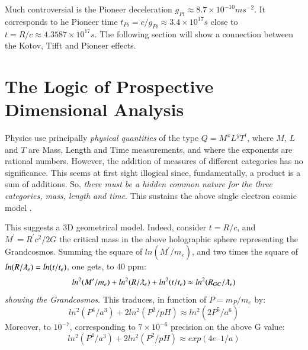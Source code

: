 \documentclass[twoside,draft]{article}
\begin{document}
\begin{sloppypar}
Much controversial is the Pioneer deceleration \cite{Nieto} $g_{Pi} \approx 8.7 \times 10^{-10} ms^{-2}$. It corresponds to he Pioneer time $t_{Pi} = c/g_{Pi} \approx 3.4 \times 10^{17} s $ close to $t = R/c \approx 4.3587 \times 10^{17} s $. The following section will show a connection between the Kotov, Tifft and Pioneer effects.

\section{The Logic of Prospective Dimensional Analysis}

Physics use principally \textit{physical quantities} of the type $Q = M^{x} L^{y} T^{t}$, where $M$, $L$ and $T$ are Mass, Length and Time measurements, and where the exponents are rational numbers. However, the addition of measures of different categories has no significance. This seems at first sight illogical since, fundamentally, a product is a sum of additions. So, \textit{there must be a hidden common nature for the three categories, mass, length and time}. This sustains the above single electron cosmic model \cite{Sanchez1}. 

This suggests a 3D geometrical model. Indeed, consider $t =R/c$, and $M^{\prime} = R^{\prime} c^{2} /2G$ the critical mass in the above holographic sphere representing the Grandcosmos. Summing the square of $ln(M^{\prime}/m_{e} )$, and two times the square of $ln(R/\lambdabar_{e} ) = ln(t/t_{e} )$, one gets, to 40 ppm:
\begin{equation}
ln^{2} (M^{\prime}/m_{e} ) + ln^{2} (R/\lambdabar_{e}) + ln^2 (t/t_{e} ) \approx ln^2 (R_{GC} /\lambdabar_{e} )
\end{equation} 
\textit{showing the Grandcosmos}. This traduces, in function of $P = m_P/m_e$ by:
\begin{equation}
ln^2(P^4/a^3) + 2 ln^2(P^2/pH) \approx ln^2(2P^5/a^6)
\end{equation}
Moreover, to $10^{-7}$, corresponding to $7 \times 10^{-6}$ precision on the above G value:
\begin{equation}
ln^2(P^4/a^3) + 2 ln^2(P^2/pH) \approx exp(4e – 1/a)
\end{equation}
 

\end{sloppypar}
\end{document}
